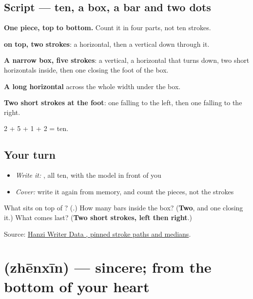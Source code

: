 \subsection*{Script — ten, a box, a bar and two dots}

\begin{quote}
\end{quote}

\textbf{One piece, top to bottom.} Count it in four parts, not ten strokes.

\textbf{ on top, two strokes}: a horizontal, then a vertical down through it.

\textbf{A narrow box, five strokes}: a vertical, a horizontal that turns down, two short horizontals inside, then one closing the foot of the box.

\textbf{A long horizontal} across the whole width under the box.

\textbf{Two short strokes at the foot}: one falling to the left, then one falling to the right.

2 + 5 + 1 + 2 = ten.

\subsection*{Your turn}
\begin{itemize}
\raggedright
  \item \emph{Write it:} , all ten, with the model in front of you
  \item \emph{Cover:} write it again from memory, and count the pieces, not the strokes
\end{itemize}

\begin{tcolorbox}[breakable,colback=teal!4,colframe=teal!35!black,title={Before you move on}]
What sits on top of ? (\textbf{}.) How many bars inside the box? (\textbf{Two}, and one closing it.) What comes last? (\textbf{Two short strokes, left then right}.)

Source: \href{https://raw.githubusercontent.com/chanind/hanzi-writer-data/68d10a4b21150cae5e1ebbd223eed289cf32d90c/data/\%E7\%9C\%9F.json}{Hanzi Writer Data , pinned stroke paths and medians}.
\end{tcolorbox}
\section[\texorpdfstring{\zh{真心} (zhēnxīn)}{真心 (zhēnxīn)}]{ (zhēnxīn) — sincere; from the bottom of your heart}

